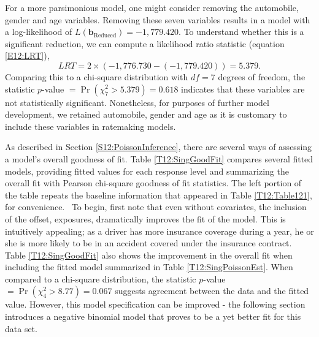 {For a more parsimonious model, one might consider removing the
automobile, gender and age variables. Removing these seven variables
results in a model with a log-likelihood of $L \left(
\mathbf{b}_{\mathrm{Reduced}}\right) =-1,779.420$. To understand
whether this is a significant reduction, we can compute a likelihood
ratio statistic (equation \ref{E12:LRT}),
\begin{equation*}
LRT=2\times \left( -1,776.730 - (-1,779.420) \right) =5.379.
\end{equation*}
Comparing this to a chi-square distribution with $df=7$ degrees of
freedom, the statistic $p$-value $=\Pr \left( \chi
_{7}^2>5.379\right) =0.618$ indicates that these variables are not
statistically significant. Nonetheless, for purposes of further
model development, we retained automobile, gender and age as it is
customary to include these variables in ratemaking models.

As described in Section \ref{S12:PoissonInference}, there are
several ways of assessing a model's overall goodness of fit. Table
\ref{T12:SingGoodFit} compares several fitted models, providing
fitted values for each response level and summarizing the overall
fit with Pearson chi-square goodness of fit statistics. The left
portion of the table repeats the baseline information that appeared
in Table \ref{T12:Table121}, for convenience. \ To begin, first note
that even without covariates, the inclusion of the offset,
exposures, dramatically improves the fit of the model. This is
intuitively appealing; as a driver has more insurance coverage
during a year, he or she is more likely to be in an accident covered
under the insurance contract. Table \ref{T12:SingGoodFit} also shows
the improvement in the overall fit when including the fitted model
summarized in Table \ref{T12:SingPoissonEst}. When compared to a
chi-square distribution, the statistic $p$-value $=\Pr \left( \chi
_{4}^2>8.77\right) =0.067$ suggests agreement between the data and
the fitted value. However, this model specification can be improved
- the following section introduces a negative binomial model that
proves to be a yet better fit for this data set.

}
